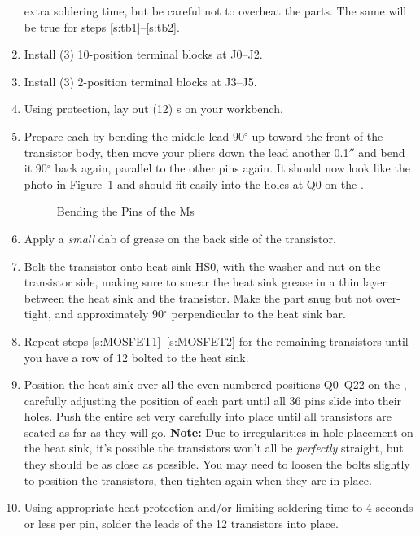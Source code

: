 \documentclass[letterpaper,twoside,onecolumn,openright,final]{memoir}
\begin{document}
\begin{enumerate}
	extra soldering time, but be careful not to overheat the parts.  The same will be true for
	steps \ref{s:tb1}--\ref{s:tb2}.
\item\label{s:tb1}
	Install (3) 10-position terminal blocks at J0--J2.  
\item\label{s:tb2}
	Install (3) 2-position terminal blocks at J3--J5.
\item\label{s:MOSFET1}
	Using  protection, lay out (12) s on your workbench.
\item	Prepare each  by bending the middle lead 90$^\circ$ up toward the front
	of the transistor body, then move your pliers down the lead another 0.1$''$ and bend it
	90$^\circ$
	back again, parallel to the other pins again.  It should now look like the photo
	in Figure~\ref{fig:mosfet} and should fit
	easily into the holes at Q0 on the .
\begin{figure}
	\centerline{ }
	\caption{Bending the Pins of the Ms\label{fig:mosfet}}
\end{figure}
\item	Apply a \emph{small} dab of  grease on the back side of the transistor.
\item\label{s:MOSFET2}
	Bolt the transistor onto heat sink HS0, with the washer and nut on the transistor side,
	making sure to smear the heat sink grease in a thin layer between the heat sink and
	the transistor.  Make the part snug but not over-tight, and approximately 90$^\circ$
	perpendicular to the heat sink bar.
\item	Repeat steps \ref{s:MOSFET1}--\ref{s:MOSFET2} for the remaining transistors until you have
	a row of 12 bolted to the heat sink.
\item	Position the heat sink over all the even-numbered positions Q0--Q22 on the ,
	carefully adjusting the position of each part until all 36 pins slide into their holes.
	Push the entire set very carefully into place until all transistors are seated as far as they
	will go.  {\bfseries Note:} Due to irregularities in hole placement on the heat sink, it's
	possible the transistors won't all be \emph{perfectly} straight, but they should be as
	close as possible.  You may need to loosen the bolts slightly to position the 
	transistors, then tighten again when they are in place.
\item	Using appropriate heat protection and/or limiting soldering time to 4 seconds or less per
	pin, solder the leads of the 12 transistors into place.  

\end{enumerate}
\end{document}
